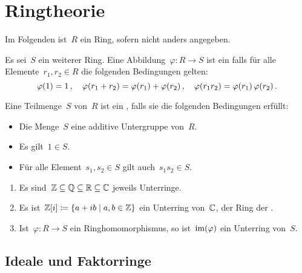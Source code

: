 \chapter{Ringtheorie}


\begin{convention}
  Im Folgenden ist~$R$ ein Ring, sofern nicht anders angegeben.
\end{convention}


\begin{definition}
  Es sei~$S$ ein weiterer Ring.
  Eine Abbildung~$\varphi \colon R \to S$ ist ein  falls für alle Elemente~$r_1, r_2 \in R$ die folgenden Bedingungen gelten:
  \[
    \varphi(1) = 1 \,,
    \quad
    \varphi(r_1 + r_2) = \varphi(r_1) + \varphi(r_2) \,,
    \quad
    \varphi(r_1 r_2) = \varphi(r_1) \, \varphi(r_2) \,.
  \]
\end{definition}

\begin{definition}
  Eine Teilmenge~$S$ von~$R$ ist ein , falls sie die folgenden Bedingungen erfüllt:
  \begin{itemize}
    \item
      Die Menge~$S$ eine additive Untergruppe von~$R$.
    \item
      Es gilt~$1 \in S$.
    \item
      Für alle Element~$s_1, s_2 \in S$ gilt auch~$s_1 s_2 \in S$.
  \end{itemize}
\end{definition}

\begin{example}
  \leavevmode
  \begin{enumerate}
    \item
      Es sind~$\mathbb{Z} \subseteq \mathbb{Q} \subseteq \mathbb{R} \subseteq \mathbb{C}$ jeweils Unterringe.
    \item
      Es ist~$\Integer[i] \defined \{ a + ib \suchthat a, b \in \Integer \}$ ein Unterring von~$\mathbb{C}$, der Ring der .
    \item
      Ist~$\varphi \colon R \to S$ ein Ringhomomorphismus, so ist~$\operatorname{im}(\varphi)$ ein Unterring von~$S$.
  \end{enumerate}
\end{example}





\section{Ideale und Faktorringe}



